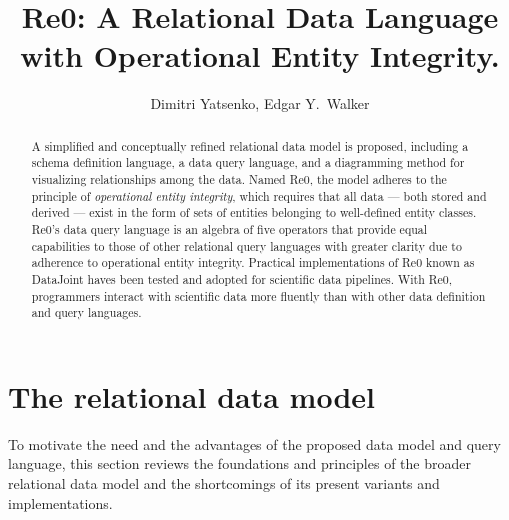 \documentclass[letter,10pt]{article}
\title{Re0: A Relational Data Language with Operational Entity Integrity.}
\author{Dimitri Yatsenko, Edgar Y.\ Walker}
\begin{document}
\maketitle
\begin{abstract}
A simplified and conceptually refined relational data model is proposed, including a schema definition language, a data query language, and a diagramming method for visualizing relationships among the data.  
Named Re0, the model adheres to the principle of \emph{operational entity integrity}, which requires that all data --- both stored and derived --- exist in the form of sets of entities belonging to well-defined entity classes.  
Re0's data query language is an algebra of five operators that provide equal capabilities to those of other relational query languages with greater clarity due to adherence to operational entity integrity. 
Practical implementations of Re0 known as DataJoint haves been tested and adopted for scientific data pipelines.  
With Re0, programmers interact with scientific data more fluently than with other data definition and query languages.
\end{abstract}
\tableofcontents 

\twocolumn

\section{The relational data model}
To motivate the need and the advantages of the proposed data model and query language, this section reviews the foundations and principles of the broader relational data model and the shortcomings of its present variants and implementations. 
\end{document}
